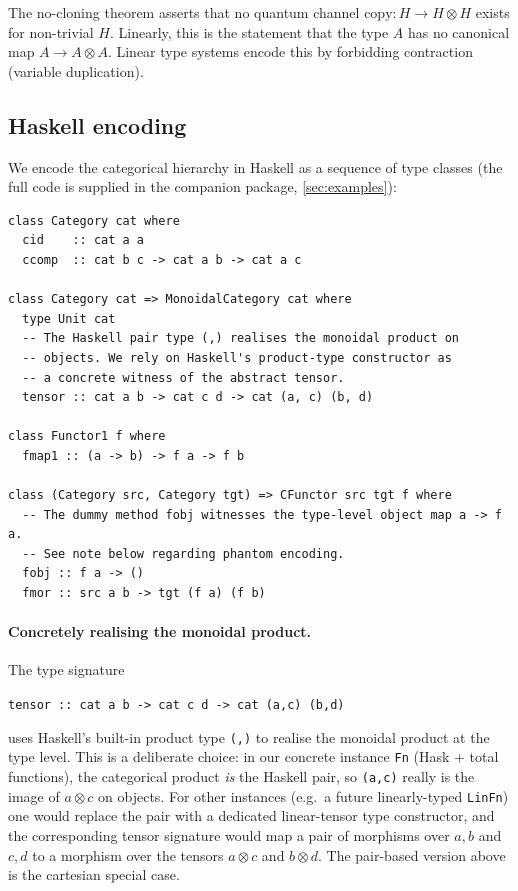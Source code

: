 \documentclass[12pt]{article}
\theoremstyle{definition}
\theoremstyle{remark}
\begin{document}
The no-cloning theorem asserts that no quantum channel $\mathrm{copy} : H \to H \otimes H$ exists for non-trivial $H$. Linearly, this is the statement that the type $A$ has no canonical map $A \to A \otimes A$. Linear type systems encode this by forbidding contraction (variable duplication).

\subsection{Haskell encoding}

We encode the categorical hierarchy in Haskell as a sequence of type classes (the full code is supplied in the companion package, \cref{sec:examples}):

\begin{verbatim}
class Category cat where
  cid    :: cat a a
  ccomp  :: cat b c -> cat a b -> cat a c

class Category cat => MonoidalCategory cat where
  type Unit cat
  -- The Haskell pair type (,) realises the monoidal product on
  -- objects. We rely on Haskell's product-type constructor as
  -- a concrete witness of the abstract tensor.
  tensor :: cat a b -> cat c d -> cat (a, c) (b, d)

class Functor1 f where
  fmap1 :: (a -> b) -> f a -> f b

class (Category src, Category tgt) => CFunctor src tgt f where
  -- The dummy method fobj witnesses the type-level object map a -> f a.
  -- See note below regarding phantom encoding.
  fobj :: f a -> ()
  fmor :: src a b -> tgt (f a) (f b)
\end{verbatim}

\paragraph{Concretely realising the monoidal product.} The type signature
\begin{center}\small
\verb|tensor :: cat a b -> cat c d -> cat (a,c) (b,d)|
\end{center}
uses Haskell's built-in product type \verb|(,)| to realise the monoidal product at the type level. This is a deliberate choice: in our concrete instance \verb|Fn| (Hask + total functions), the categorical product \emph{is} the Haskell pair, so \verb|(a,c)| really is the image of $a \otimes c$ on objects. For other instances (e.g.\ a future linearly-typed \verb|LinFn|) one would replace the pair with a dedicated linear-tensor type constructor, and the corresponding tensor signature would map a pair of morphisms over $a, b$ and $c, d$ to a morphism over the tensors $a \otimes c$ and $b \otimes d$. The pair-based version above is the cartesian special case.
\end{document}
